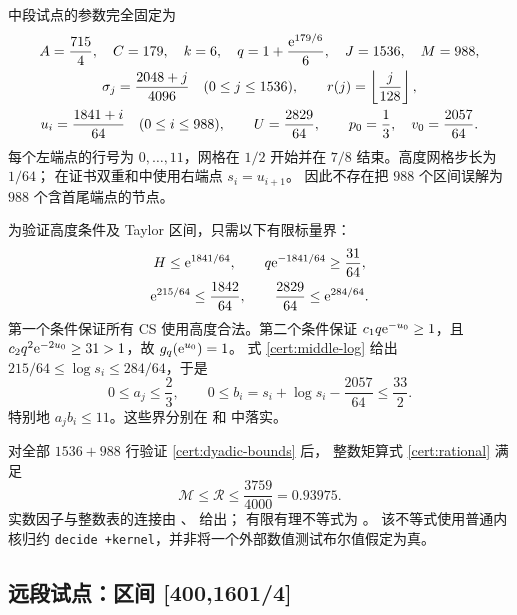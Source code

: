 中段试点的参数完全固定为
\begin{equation}\label{cert:middle-parameters}
 \begin{gathered}
 A=\frac{715}{4},\quad C=179,\quad k=6,\quad
 q=1+\frac{\mathrm e^{179/6}}6,\quad J=1536,\quad M=988,\\
 \sigma_j=\frac{2048+j}{4096}\quad(0\leq j\leq1536),
 \qquad r(j)=\left\lfloor\frac j{128}\right\rfloor,\\
 u_i=\frac{1841+i}{64}\quad(0\leq i\leq988),\qquad
 U=\frac{2829}{64},\qquad
 p_0=\frac13,\quad v_0=\frac{2057}{64}.
 \end{gathered}
\end{equation}
每个左端点的行号为 $0,\ldots,11$，网格在
$1/2$ 开始并在 $7/8$ 结束。高度网格步长为 $1/64$；
在证书双重和中使用右端点 $s_i=u_{i+1}$。
因此不存在把 $988$ 个区间误解为 $988$ 个含首尾端点的节点。

为验证高度条件及 Taylor 区间，只需以下有限标量界：
\begin{gather}
 H\leq\mathrm e^{1841/64},\qquad
 q\mathrm e^{-1841/64}\geq\frac{31}{64},\label{cert:middle-start}\\
 \mathrm e^{215/64}\leq\frac{1842}{64},\qquad
 \frac{2829}{64}\leq\mathrm e^{284/64}. \label{cert:middle-log}
\end{gather}
第一个条件保证所有 CS 使用高度合法。第二个条件保证
$c_1q\mathrm e^{-u_0}\geq1$，且
$c_2q^2\mathrm e^{-2u_0}\geq31>1$，故 $g_q(\mathrm e^{u_0})=1$。
式 \eqref{cert:middle-log} 给出
$215/64\leq\log s_i\leq284/64$，于是
\[
 0\leq a_j\leq\frac23,\qquad
 0\leq b_i=s_i+\log s_i-\frac{2057}{64}\leq\frac{33}{2}.
\]
特别地 $a_jb_i\leq11$。这些界分别在
和  中落实。

对全部 $1536+988$ 行验证 \eqref{cert:dyadic-bounds} 后，
整数矩算式 \eqref{cert:rational} 满足
\begin{equation}\label{cert:middle-main}
 \mathcal M\leq\mathcal R\leq\frac{3759}{4000}=0.93975.
\end{equation}
实数因子与整数表的连接由
、
 给出；
有限有理不等式为
。
该不等式使用普通内核归约
\texttt{decide +kernel}，并非将一个外部数值测试布尔值假定为真。

\subsection{远段试点：区间 [400,1601/4]}

